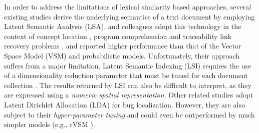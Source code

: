 \documentclass[sigconf,review,anonymous]{acmart}
\begin{document}
In order to address the limitations of lexical similarity based approaches, several existing studies \cite{Maletic, MarcusMaletic,irmarcus} derive the underlying semantics of a text document by employing Latent Semantic Analysis (LSA). \citeauthor{irmarcus} and colleagues adopt this technology in the context of concept location \cite{irmarcus,MarcusMaletic}, program comprehension \cite{Maletic} and traceability link recovery problems \cite{MarcusLSI}, and reported higher performance than that of the Vector Space Model (VSM) and probabilistic models.
Unfortunately, their approach suffers from a major limitation.
Latent Semantic Indexing (LSI) requires the use of a dimensionality reduction parameter that must be tuned for each document collection \cite{Kontostathis}.
The results returned by LSI can also be difficult to interpret, as
they are expressed using a \emph{numeric spatial representation}.
Other related studies \cite{LukinsBL,Nguyen} adopt Latent Dirichlet Allocation (LDA) for bug localization. However, they are also subject to their \emph{hyper-parameter tuning} and could even be outperformed by much simpler models (e.g., rVSM \cite{Jian}). 
\end{document}
